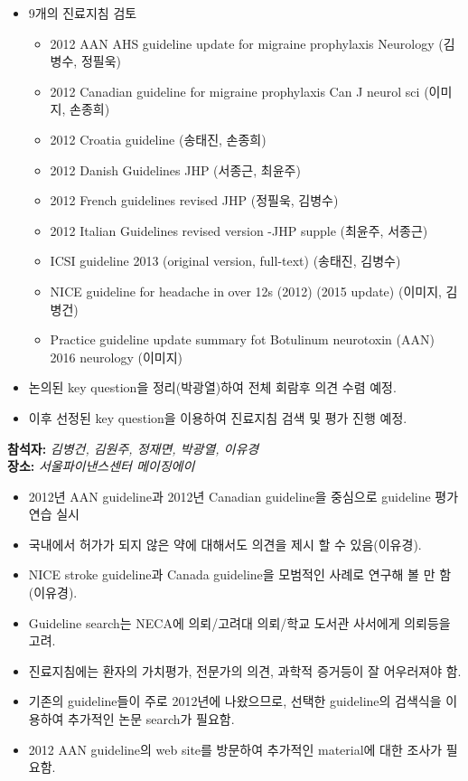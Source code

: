 \documentclass[idxtotoc,hyperref,openany, oneside]{labbook} %
\newcommand{\attend}[1]{\textbf{참석자:} \emph{#1}\\}
\newcommand{\place}[1]{\textbf{장소:} \emph{#1}\\}
\begin{document}
	\begin{itemize}
		\item 9개의 진료지침 검토
		\begin{itemize}
			\item 2012 AAN AHS guideline update for migraine prophylaxis Neurology (김병수, 정필욱)
			\item 2012 Canadian guideline for migraine prophylaxis Can J neurol sci (이미지, 손종희)
			\item 2012 Croatia guideline (송태진, 손종희)
			\item 2012 Danish Guidelines JHP (서종근, 최윤주)
			\item 2012 French guidelines revised JHP (정필욱, 김병수)
			\item 2012 Italian Guidelines revised version -JHP supple (최윤주, 서종근) 
			\item ICSI guideline 2013 (original version, full-text) (송태진, 김병수)
			\item NICE guideline for headache in over 12s (2012) (2015 update) (이미지, 김병건)
			\item Practice guideline update summary fot Botulinum neurotoxin (AAN) 2016 neurology (이미지)
		\end{itemize}
		\item 논의된 key question을 정리(박광열)하여 전체 회람후 의견 수렴 예정.
		\item 이후 선정된 key question을 이용하여 진료지침 검색 및 평가 진행 예정.
	\end{itemize}
	
\attend{김병건, 김원주, 정재면, 박광열, 이유경}
\place{서울파이낸스센터 메이징에이}

	\begin{itemize}
		\item 2012년 AAN guideline과 2012년 Canadian guideline을 중심으로 guideline 평가 연습 실시
		\item 국내에서 허가가 되지 않은 약에 대해서도 의견을 제시 할 수 있음(이유경).
		\item NICE stroke guideline과 Canada guideline을 모범적인 사례로 연구해 볼 만 함 (이유경).
		\item Guideline search는 NECA에 의뢰/고려대 의뢰/학교 도서관 사서에게 의뢰등을 고려.
		\item 진료지침에는 환자의 가치평가, 전문가의 의견, 과학적 증거등이 잘 어우러져야 함.
		\item 기존의 guideline들이 주로 2012년에 나왔으므로, 선택한 guideline의 검색식을 이용하여 추가적인 논문 search가 필요함.
		\item 2012 AAN guideline의 web site를 방문하여 추가적인 material에 대한 조사가 필요함.
	\end{itemize}
	
\end{document}
